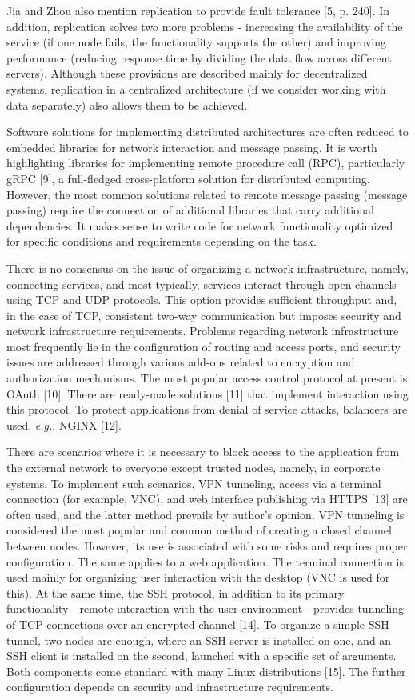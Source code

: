 \documentclass[
]{ceurart}
\begin{document}
Jia and Zhou also mention replication to provide fault tolerance [5, p. 240]. In addition, replication solves two more problems - increasing the availability of the service (if one node fails, the functionality supports the other) and improving performance (reducing response time by dividing the data flow across different servers). Although these provisions are described mainly for decentralized systems, replication in a centralized architecture (if we consider working with data separately) also allows them to be achieved.

Software solutions for implementing distributed architectures are often reduced to embedded libraries for network interaction and message passing. It is worth highlighting libraries for implementing remote procedure call (RPC), particularly gRPC [9], a full-fledged cross-platform solution for distributed computing. However, the most common solutions related to remote message passing (message passing) require the connection of additional libraries that carry additional dependencies. It makes sense to write code for network functionality optimized for specific conditions and requirements depending on the task.

There is no consensus on the issue of organizing a network infrastructure, namely, connecting services, and most typically, services interact through open channels using TCP and UDP protocols. This option provides sufficient throughput and, in the case of TCP, consistent two-way communication but imposes security and network infrastructure requirements. Problems regarding network infrastructure most frequently lie in the configuration of routing and access ports, and security issues are addressed through various add-ons related to encryption and authorization mechanisms. The most popular access control protocol at present is OAuth [10]. There are ready-made solutions [11] that implement interaction using this protocol. To protect applications from denial of service attacks, balancers are used, \emph{e.g.}, NGINX [12].

There are scenarios where it is necessary to block access to the application from the external network to everyone except trusted nodes, namely, in corporate systems. To implement such scenarios, VPN tunneling, access via a terminal connection (for example, VNC), and web interface publishing via HTTPS [13] are often used, and the latter method prevails by author's opinion. VPN tunneling is considered the most popular and common method of creating a closed channel between nodes. However, its use is associated with some risks and requires proper configuration. The same applies to a web application. The terminal connection is used mainly for organizing user interaction with the desktop (VNC is used for this). At the same time, the SSH protocol, in addition to its primary functionality - remote interaction with the user environment - provides tunneling of TCP connections over an encrypted channel [14]. To organize a simple SSH tunnel, two nodes are enough, where an SSH server is installed on one, and an SSH client is installed on the second, launched with a specific set of arguments. Both components come standard with many Linux distributions [15]. The further configuration depends on security and infrastructure requirements.
\end{document}
